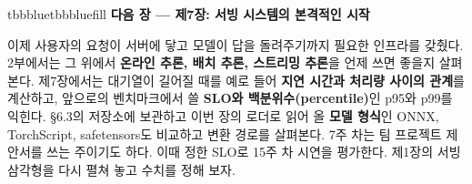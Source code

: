 \begin{calloutbox}{tbbblue}{tbbbluefill}
{\normalsize\bfseries\color{tbbblue}다음 장 — 제7장: 서빙 시스템의 본격적인 시작}\par\vspace{3pt}
이제 사용자의 요청이 서버에 닿고 모델이 답을 돌려주기까지 필요한 인프라를 갖췄다. 2부에서는 그 위에서 \textbf{온라인 추론, 배치 추론, 스트리밍 추론}을 언제 쓰면 좋을지 살펴본다. 제7장에서는 대기열이 길어질 때를 예로 들어 \textbf{지연 시간과 처리량 사이의 관계}를 계산하고, 앞으로의 벤치마크에서 쓸 \textbf{SLO와 백분위수(percentile)}인 p95와 p99를 익힌다. §6.3의 저장소에 보관하고 이번 장의 로더로 읽어 올 \textbf{모델 형식}인 ONNX, TorchScript, safetensors도 비교하고 변환 경로를 살펴본다. 7주 차는 팀 프로젝트 제안서를 쓰는 주이기도 하다. 이때 정한 SLO로 15주 차 시연을 평가한다. 제1장의 서빙 삼각형을 다시 펼쳐 놓고 수치를 정해 보자.
\end{calloutbox}
